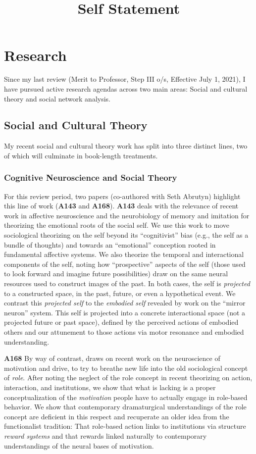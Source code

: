 \documentclass[a4paper,11pt]{extarticle}
\title{Self Statement}
\date{\vspace{-5ex}}
\begin{document}
\maketitle

\section*{Research}
Since my last review (Merit to Professor, Step III o/s, Effective July 1, 2021), I have pursued active research agendas across two main areas: Social and cultural theory and social network analysis.

\subsection*{Social and Cultural Theory}
My recent social and cultural theory work has split into three distinct lines, two of which will culminate in book-length treatments.

\subsubsection*{Cognitive Neuroscience and Social Theory}
For this review period, two papers (co-authored with Seth Abrutyn) highlight this line of work (\textbf{A143} and \textbf{A168}). \textbf{A143} deals with the relevance of recent work in affective neuroscience and the neurobiology of memory and imitation for theorizing the emotional roots of the social self. We use this work to move sociological theorizing on the self beyond its ``cognitivist'' bias (e.g., the self as a bundle of thoughts) and towards an ``emotional'' conception rooted in fundamental affective systems. We also theorize the temporal and interactional components of the self, noting how ``prospective'' aspects of the self (those used to look forward and imagine future possibilities) draw on the same neural resources used to construct images of the past. In both cases, the self is \textit{projected} to a constructed space, in the past, future, or even a hypothetical event. We contrast this \textit{projected self} to the \textit{embodied self} revealed by work on the ``mirror neuron'' system. This self is projected into a concrete interactional space (not a projected future or past space), defined by the perceived actions of embodied others and our attunement to those actions via motor resonance and embodied understanding.  

\textbf{A168} By way of contrast, draws on recent work on the neuroscience of motivation and drive, to try to breathe new life into the old sociological concept of \textit{role}. After noting the neglect of the role concept in recent theorizing on action, interaction, and institutions, we show that what is lacking is a proper conceptualization of the \textit{motivation} people have to actually engage in role-based behavior. We show that contemporary dramaturgical understandings of the role concept are deficient in this respect and recuperate an older idea from the functionalist tradition: That role-based action links to institutions via structure \textit{reward systems} and that rewards linked naturally to contemporary understandings of the neural bases of motivation.
\end{document}
